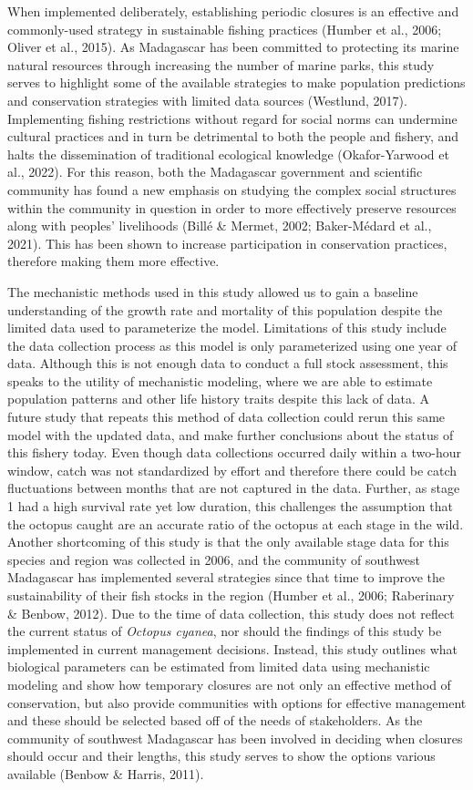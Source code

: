\documentclass[
]{article}
\begin{document}
When implemented deliberately, establishing periodic closures is an effective and commonly-used strategy in sustainable fishing practices (Humber et al., 2006; Oliver et al., 2015). As Madagascar has been committed to protecting its marine natural resources through increasing the number of marine parks, this study serves to highlight some of the available strategies to make population predictions and conservation strategies with limited data sources (Westlund, 2017). Implementing fishing restrictions without regard for social norms can undermine cultural practices and in turn be detrimental to both the people and fishery, and halts the dissemination of traditional ecological knowledge (Okafor-Yarwood et al., 2022). For this reason, both the Madagascar government and scientific community has found a new emphasis on studying the complex social structures within the community in question in order to more effectively preserve resources along with peoples' livelihoods (Billé \& Mermet, 2002; Baker-Médard et al., 2021). This has been shown to increase participation in conservation practices, therefore making them more effective.

The mechanistic methods used in this study allowed us to gain a baseline understanding of the growth rate and mortality of this population despite the limited data used to parameterize the model. Limitations of this study include the data collection process as this model is only parameterized using one year of data. Although this is not enough data to conduct a full stock assessment, this speaks to the utility of mechanistic modeling, where we are able to estimate population patterns and other life history traits despite this lack of data. A future study that repeats this method of data collection could rerun this same model with the updated data, and make further conclusions about the status of this fishery today. Even though data collections occurred daily within a two-hour window, catch was not standardized by effort and therefore there could be catch fluctuations between months that are not captured in the data. Further, as stage 1 had a high survival rate yet low duration, this challenges the assumption that the octopus caught are an accurate ratio of the octopus at each stage in the wild. Another shortcoming of this study is that the only available stage data for this species and region was collected in 2006, and the community of southwest Madagascar has implemented several strategies since that time to improve the sustainability of their fish stocks in the region (Humber et al., 2006; Raberinary \& Benbow, 2012). Due to the time of data collection, this study does not reflect the current status of \emph{Octopus cyanea}, nor should the findings of this study be implemented in current management decisions. Instead, this study outlines what biological parameters can be estimated from limited data using mechanistic modeling and show how temporary closures are not only an effective method of conservation, but also provide communities with options for effective management and these should be selected based off of the needs of stakeholders. As the community of southwest Madagascar has been involved in deciding when closures should occur and their lengths, this study serves to show the options various available (Benbow \& Harris, 2011).
\end{document}
